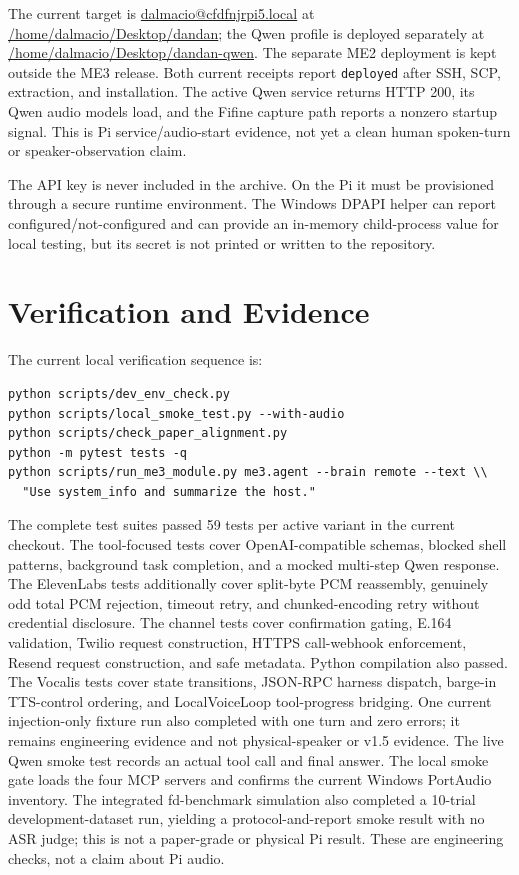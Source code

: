 \documentclass[sigconf,nonacm]{acmart}
\begin{document}
\begin{sloppypar}
The current target is \url{dalmacio@cfdfnjrpi5.local} at
\url{/home/dalmacio/Desktop/dandan}; the Qwen profile is deployed separately
at \url{/home/dalmacio/Desktop/dandan-qwen}. The separate ME2 deployment is
kept outside the ME3 release. Both current receipts report \texttt{deployed}
after SSH, SCP, extraction, and installation. The active Qwen service returns
HTTP 200, its Qwen audio models load, and the Fifine capture path reports a
nonzero startup signal. This is Pi service/audio-start evidence, not yet a
clean human spoken-turn or speaker-observation claim.
\end{sloppypar}

The API key is never included in the archive. On the Pi it must be provisioned
through a secure runtime environment. The Windows DPAPI helper can report
configured/not-configured and can provide an in-memory child-process value for
local testing, but its secret is not printed or written to the repository.

\section{Verification and Evidence}

The current local verification sequence is:

\begin{lstlisting}
python scripts/dev_env_check.py
python scripts/local_smoke_test.py --with-audio
python scripts/check_paper_alignment.py
python -m pytest tests -q
python scripts/run_me3_module.py me3.agent --brain remote --text \\
  "Use system_info and summarize the host."
\end{lstlisting}

The complete test suites passed 59 tests per active variant in the current
checkout. The
tool-focused tests cover OpenAI-compatible schemas, blocked shell patterns,
background task completion, and a mocked multi-step Qwen response. The
ElevenLabs tests additionally cover split-byte PCM reassembly, genuinely odd
total PCM rejection, timeout retry, and chunked-encoding retry without
credential disclosure. The channel tests cover confirmation gating, E.164
validation, Twilio request construction, HTTPS call-webhook enforcement,
Resend request construction, and safe metadata. Python compilation also passed.
The Vocalis tests cover state transitions, JSON-RPC harness dispatch,
barge-in TTS-control ordering, and LocalVoiceLoop tool-progress bridging.
One current injection-only fixture run also completed with one turn and zero
errors; it remains engineering evidence and not physical-speaker or v1.5
evidence.
The live Qwen smoke test records an actual tool call and final answer. The
local smoke gate loads the four MCP servers and confirms the current Windows
PortAudio inventory. The integrated fd-benchmark simulation also completed a
10-trial development-dataset run, yielding a protocol-and-report smoke result
with no ASR judge; this is not a paper-grade or physical Pi result. These are
engineering checks, not a claim about Pi audio.
\end{document}
